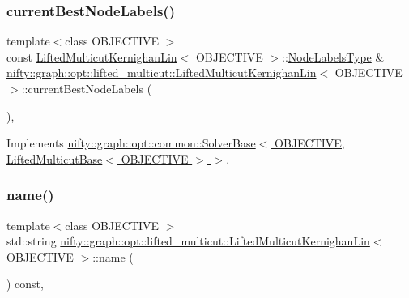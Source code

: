 \subsubsection{\texorpdfstring{current\+Best\+Node\+Labels()}{currentBestNodeLabels()}}
{\footnotesize\ttfamily template$<$class O\+B\+J\+E\+C\+T\+I\+VE $>$ \\
const \hyperlink{classnifty_1_1graph_1_1opt_1_1lifted__multicut_1_1LiftedMulticutKernighanLin}{Lifted\+Multicut\+Kernighan\+Lin}$<$ O\+B\+J\+E\+C\+T\+I\+VE $>$\+::\hyperlink{classnifty_1_1graph_1_1opt_1_1lifted__multicut_1_1LiftedMulticutKernighanLin_aac39b263efe0f990f6bf6989babec8a4}{Node\+Labels\+Type} \& \hyperlink{classnifty_1_1graph_1_1opt_1_1lifted__multicut_1_1LiftedMulticutKernighanLin}{nifty\+::graph\+::opt\+::lifted\+\_\+multicut\+::\+Lifted\+Multicut\+Kernighan\+Lin}$<$ O\+B\+J\+E\+C\+T\+I\+VE $>$\+::current\+Best\+Node\+Labels (\begin{DoxyParamCaption}{ }\end{DoxyParamCaption})\hspace{0.3cm}{\ttfamily [inline]}, {\ttfamily [virtual]}}



Implements \hyperlink{classnifty_1_1graph_1_1opt_1_1common_1_1SolverBase_a7bbe01ee201cf3157b251e54c5ff0619}{nifty\+::graph\+::opt\+::common\+::\+Solver\+Base$<$ O\+B\+J\+E\+C\+T\+I\+V\+E, Lifted\+Multicut\+Base$<$ O\+B\+J\+E\+C\+T\+I\+V\+E $>$ $>$}.

\mbox{\label{classnifty_1_1graph_1_1opt_1_1lifted__multicut_1_1LiftedMulticutKernighanLin_a682849d66dfe885424c729600754a160}} 
\subsubsection{\texorpdfstring{name()}{name()}}
{\footnotesize\ttfamily template$<$class O\+B\+J\+E\+C\+T\+I\+VE $>$ \\
std\+::string \hyperlink{classnifty_1_1graph_1_1opt_1_1lifted__multicut_1_1LiftedMulticutKernighanLin}{nifty\+::graph\+::opt\+::lifted\+\_\+multicut\+::\+Lifted\+Multicut\+Kernighan\+Lin}$<$ O\+B\+J\+E\+C\+T\+I\+VE $>$\+::name (\begin{DoxyParamCaption}{ }\end{DoxyParamCaption}) const\hspace{0.3cm}{\ttfamily [inline]}, {\ttfamily [virtual]}}



